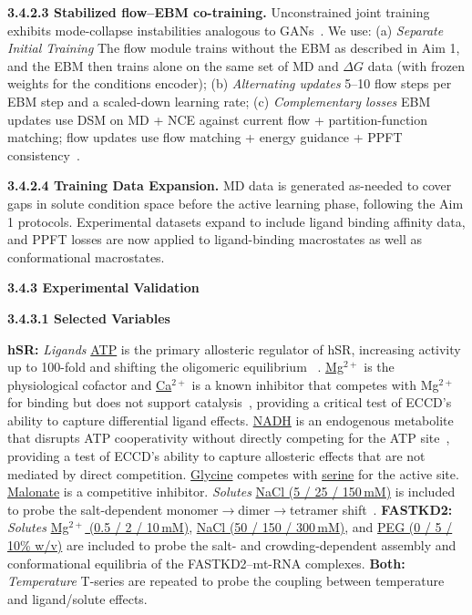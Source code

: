 \documentclass[11pt]{article}
\begin{document}
\textbf{3.4.2.3 Stabilized flow--EBM co-training.} Unconstrained joint training exhibits mode-collapse instabilities analogous to GANs~\cite{rotskoff_Sampling_2024}. We use: (a) \emph{Separate Initial Training} The flow module trains without the EBM as described in Aim 1, and the EBM then trains alone on the same set of MD and $\Delta G$ data (with frozen weights for the conditions encoder); (b) \emph{Alternating updates} 5--10 flow steps per EBM step and a scaled-down learning rate; (c) \emph{Complementary losses} EBM updates use DSM on MD + NCE against current flow + partition-function matching; flow updates use flow matching + energy guidance + PPFT consistency~\cite{diez_BOLTZMANN_2025,chen_CoarseGrained_2026}.

\textbf{3.4.2.4 Training Data Expansion.} MD data is generated as-needed to cover gaps in solute condition space before the active learning phase, following the Aim 1 protocols. Experimental datasets expand to include ligand binding affinity data, and PPFT losses are now applied to ligand-binding macrostates as well as conformational macrostates.

\textbf{3.4.3 Experimental Validation}

\textbf{3.4.3.1 Selected Variables} 

\textbf{hSR:} \emph{Ligands} \uline{ATP} is the primary allosteric regulator of hSR, increasing activity up to 100-fold and shifting the oligomeric equilibrium ~\cite{bruno_Regulation_2017}. \uline{Mg$^{2+}$} is the physiological cofactor and \uline{Ca$^{2+}$} is a known inhibitor that competes with Mg$^{2+}$ for binding but does not support catalysis~\cite{bruno_Regulation_2017}, providing a critical test of ECCD's ability to capture differential ligand effects. \uline{NADH} is an endogenous metabolite that disrupts ATP cooperativity without directly competing for the ATP site~\cite{bruno_Regulation_2017}, providing a test of ECCD's ability to capture allosteric effects that are not mediated by direct competition. \uline{Glycine} competes with \uline{serine} for the active site. \uline{Malonate}  is a competitive inhibitor. \emph{Solutes} \uline{NaCl (5 / 25 / 150\,mM)} is included to probe the salt-dependent monomer$\rightarrow$dimer$\rightarrow$tetramer shift~\cite{bruno_Regulation_2017}.  \textbf{FASTKD2:} \emph{Solutes} \uline{Mg$^{2+}$ (0.5 / 2 / 10\,mM)}, \uline{NaCl (50 / 150 / 300\,mM)}, and \uline{PEG (0 / 5 / 10\% w/v)} are included to probe the salt- and crowding-dependent assembly and conformational equilibria of the FASTKD2--mt-RNA complexes.  \textbf{Both:} \emph{Temperature} T-series are repeated to probe the coupling between temperature and ligand/solute effects.
\end{document}
